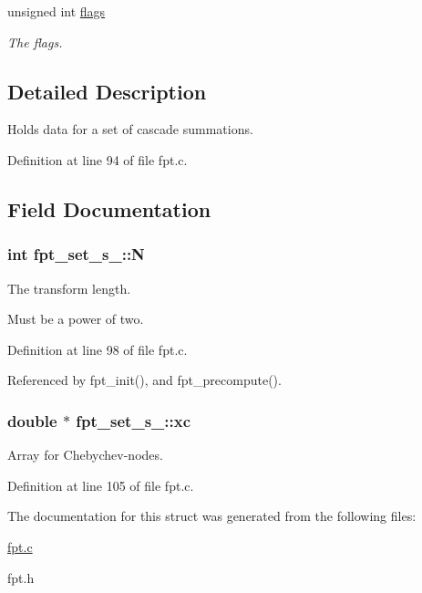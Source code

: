 \begin{DoxyCompactItemize}
\item 
\hypertarget{structfpt__set__s___a401070e7725566f06ae740e7e99a12a2}{unsigned int \hyperlink{structfpt__set__s___a401070e7725566f06ae740e7e99a12a2}{flags}}\label{structfpt__set__s___a401070e7725566f06ae740e7e99a12a2}

\begin{DoxyCompactList}\small\item\em The flags. \end{DoxyCompactList}\end{DoxyCompactItemize}


\subsection{Detailed Description}
Holds data for a set of cascade summations. 

Definition at line 94 of file fpt.\-c.



\subsection{Field Documentation}
\hypertarget{structfpt__set__s___aa353a04683b31bed668ee490d5df1b81}{
\subsubsection[{N}]{\setlength{\rightskip}{0pt plus 5cm}int fpt\-\_\-set\-\_\-s\-\_\-\-::\-N}}\label{structfpt__set__s___aa353a04683b31bed668ee490d5df1b81}


The transform length. 

Must be a power of two. 

Definition at line 98 of file fpt.\-c.



Referenced by fpt\-\_\-init(), and fpt\-\_\-precompute().

\hypertarget{structfpt__set__s___a226e29e0f97627e77ec4fcebd0c49fdf}{
\subsubsection[{xc}]{\setlength{\rightskip}{0pt plus 5cm}double $\ast$ fpt\-\_\-set\-\_\-s\-\_\-\-::xc}}\label{structfpt__set__s___a226e29e0f97627e77ec4fcebd0c49fdf}


Array for Chebychev-\/nodes. 



Definition at line 105 of file fpt.\-c.



The documentation for this struct was generated from the following files\-:\begin{DoxyCompactItemize}
\item 
\hyperlink{fpt_8c}{fpt.\-c}\item 
fpt.\-h\end{DoxyCompactItemize}
